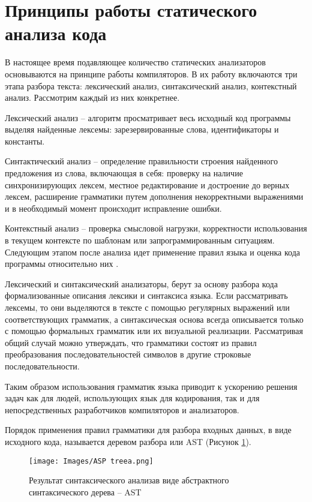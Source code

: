 \section{Принципы работы статического анализа кода}

В настоящее время подавляющее количество статических анализаторов основываются на принципе работы компиляторов. В их работу включаются три этапа разбора текста: лексический анализ, синтаксический анализ, контекстный анализ. Рассмотрим каждый из них конкретнее.

Лексический анализ -- алгоритм просматривает весь исходный код программы выделяя найденные лексемы: зарезервированные слова, идентификаторы и константы. 

Синтактический анализ -- определение правильности строения найденного предложения из слова, включающая в себя: проверку на наличие синхронизирующих лексем, местное редактирование и достроение до верных лексем, расширение грамматики путем дополнения некорректными выражениями и в необходимый момент происходит исправление ошибки. 

Контекстный анализ -- проверка смысловой нагрузки, корректности использования в текущем контексте по шаблонам или запрограммированным ситуациям. Следующим этапом после анализа идет применение правил языка и оценка кода программы относительно них \cite{16}.

Лексический и синтаксический анализаторы, берут за основу разбора кода формализованные описания лексики и синтаксиса языка. 
Если рассматривать лексемы, то они выделяются в тексте с помощью регулярных выражений или соответствующих грамматик, а синтаксическая основа всегда описывается только с помощью формальных грамматик или их визуальной реализации. Рассматривая общий случай можно утверждать, что грамматики состоят из правил преобразования последовательностей символов в другие строковые последовательности. 

Таким образом использования грамматик языка приводит к ускорению решения задач как для людей, использующих язык для кодирования, так и для непосредственных разработчиков компиляторов и анализаторов.

Порядок применения правил грамматики для разбора
входных данных, в виде исходного кода, называется деревом разбора или AST (Рисунок \ref{fig:2}). 

\begin{figure}[!h]
    \center
    \texttt{[image: Images/ASP treea.png]}
    \caption{Результат синтаксического анализав виде абстрактного синтаксического дерева – AST }
    \label{fig:2}
\end{figure}


